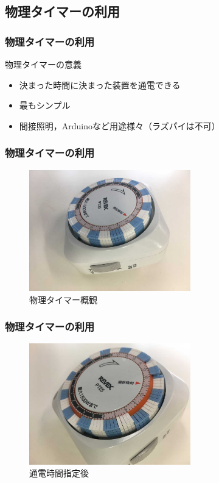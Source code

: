 \documentclass[10pt, dvipdfmx]{beamer}
\begin{document}
    \subsection{物理タイマーの利用}
        \begin{frame}
            \frametitle{物理タイマーの利用}
            \begin{block}{物理タイマーの意義}
                \begin{itemize}
                    \item 決まった時間に決まった装置を通電できる
                    \item 最もシンプル
                    \item 間接照明，Arduinoなど用途様々（ラズパイは不可）
                \end{itemize}
            \end{block}
        \end{frame}

        \begin{frame}
            \frametitle{物理タイマーの利用}
                \begin{figure}[htb]
                    \includegraphics[width=70mm]{images/timer-1.jpg}
                    \caption{物理タイマー概観}
                    \label{fig:26}
                \end{figure}
        \end{frame}

        \begin{frame}
            \frametitle{物理タイマーの利用}
                \begin{figure}[htb]
                    \includegraphics[width=70mm]{images/timer-2.jpg}
                    \caption{通電時間指定後}
                    \label{fig:27}
                \end{figure}
        \end{frame}
\end{document}
